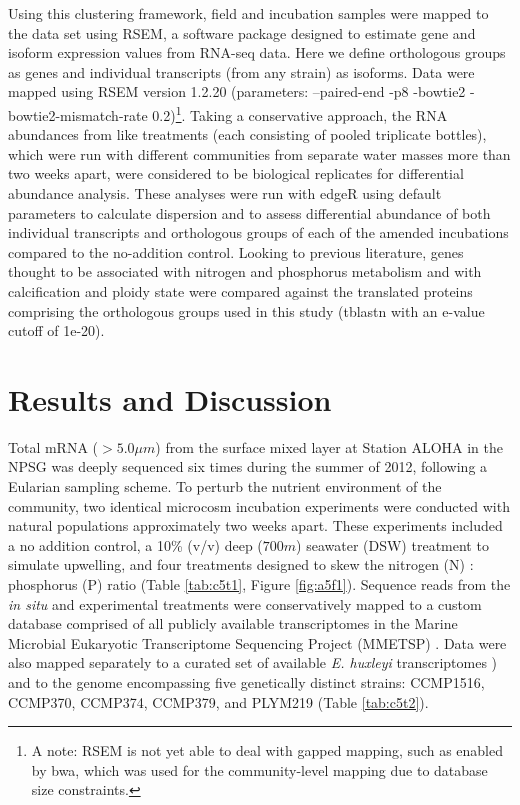 Using this clustering framework, field and incubation samples were mapped to the data set using RSEM, a software package designed to estimate gene and isoform expression values from RNA-seq data. Here we define orthologous groups as genes and individual transcripts (from any strain) as isoforms. Data were mapped using RSEM version 1.2.20 (parameters: --paired-end -p8 -bowtie2 -bowtie2-mismatch-rate 0.2)\footnote{A note: RSEM is not yet able to deal with gapped mapping, such as enabled by bwa, which was used for the community-level mapping due to database size constraints.}. Taking a conservative approach, the RNA abundances from like treatments (each consisting of pooled triplicate bottles), which were run with different communities from separate water masses more than two weeks apart, were considered to be biological replicates for differential abundance analysis. These analyses were run with edgeR using default parameters to calculate dispersion and to assess differential abundance of both individual transcripts and orthologous groups of each of the amended incubations compared to the no-addition control. Looking to previous literature, genes thought to be associated with nitrogen and phosphorus metabolism \citep{Dyhrman2006, Rokitta2014, McKew2015} and with calcification and ploidy state \citep{VonDassow2009, Mackinder2011, Frada2012} were compared against the translated proteins comprising the orthologous groups used in this study (tblastn with an e-value cutoff of 1e-20).\par



\section{Results and Discussion}

Total mRNA ($>5.0 \mu m$) from the surface mixed layer at Station ALOHA in the NPSG was deeply sequenced six times during the summer of 2012, following a Eularian sampling scheme. To perturb the nutrient environment of the community, two identical microcosm incubation experiments were conducted with natural populations approximately two weeks apart. These experiments included a no addition control, a 10\% (v/v) deep ($700m$) seawater (DSW) treatment to simulate upwelling, and four treatments designed to skew the nitrogen (N) : phosphorus (P) ratio (Table \ref{tab:c5t1}, Figure \ref{fig:a5f1}). Sequence reads from the \textit{in situ} and experimental treatments were conservatively mapped to a custom database comprised of all publicly available transcriptomes in the Marine Microbial Eukaryotic Transcriptome Sequencing Project (MMETSP) \citep{Keeling2014}. Data were also mapped separately to a curated set of available \textit{E. huxleyi} transcriptomes \citep{Keeling2014}) and to the genome \citep{Read2013} encompassing five genetically distinct strains: CCMP1516, CCMP370, CCMP374, CCMP379, and PLYM219 (Table \ref{tab:c5t2}).\par


